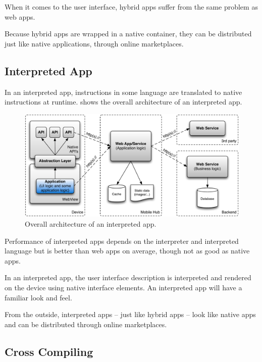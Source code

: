 \npar When it comes to the user interface, hybrid apps suffer from the same problem as web apps. 

\npar Because hybrid apps are wrapped in a native container, they can be distributed just like native applications, through online marketplaces. 

\subsection{Interpreted App}

\npar In an interpreted app, instructions in some language are translated to native instructions at runtime.  shows the overall architecture of an interpreted app.

\begin{figure}[h!]
    \begin{center}
        \includegraphics[width=\textwidth]{figs/interpreted.pdf}
        \caption{
            Overall architecture of an interpreted app.
        }
        \label{fig:interpreted}
    \end{center}
\end{figure}

\npar Performance of interpreted apps depends on the interpreter and interpreted language but is better than web apps on average, though not as good as native apps. 

\npar In an interpreted app, the user interface description is interpreted and rendered on the device using native interface elements. An interpreted app will have a familiar look and feel.

\npar From the outside, interpreted apps -- just like hybrid apps -- look like native apps and can be distributed through online marketplaces.

\subsection{Cross Compiling}

